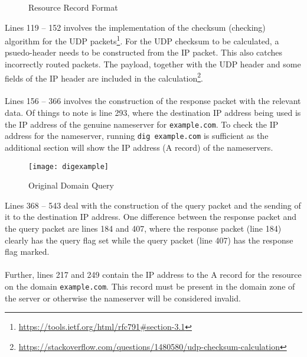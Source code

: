 \documentclass[a4paper,12pt]{article}
\begin{document}
\begin{figure}[H]
					\caption{Resource Record Format}
						\label{fig:RRForm}
					\end{figure}
					\noindent Lines 119 -- 152 involves the implementation of the checksum (checking) algorithm for the UDP packets\footnote[6]{\url{https://tools.ietf.org/html/rfc791\#section-3.1}}. For the UDP checksum to be calculated, a psuedo-header needs to be constructed from the IP packet. This also catches incorrectly routed packets. The payload, together with the UDP header and some fields of the IP header are included in the calculation\footnote[7]{\url{https://stackoverflow.com/questions/1480580/udp-checksum-calculation}}.\\\\
					Lines 156 -- 366 involves the construction of the response packet with the relevant data. Of things to note is line 293, where the destination IP address being used is the IP address of the genuine nameserver for \texttt{example.com}. To check the IP address for the nameserver, running \texttt{dig example.com} is sufficient as the additional section will show the IP address (A record) of the nameservers.
\begin{figure}[H]
\centering
\texttt{[image: digexample]}
\caption{Original Domain Query}
\label{fig:digexample}
\end{figure}
\noindent Lines 368 -- 543 deal with the construction of the query packet and the sending of it to the destination IP address. One difference between the response packet and the query packet are lines 184 and 407, where the response packet (line 184) clearly has the query flag set while the query packet (line 407) has the response flag marked.\\\\Further, lines 217 and 249 contain the IP address to the A record for the resource on the domain \texttt{example.com}. This record must be present in the domain zone of the server or otherwise the nameserver will be considered invalid.
\newpage
\end{document}
